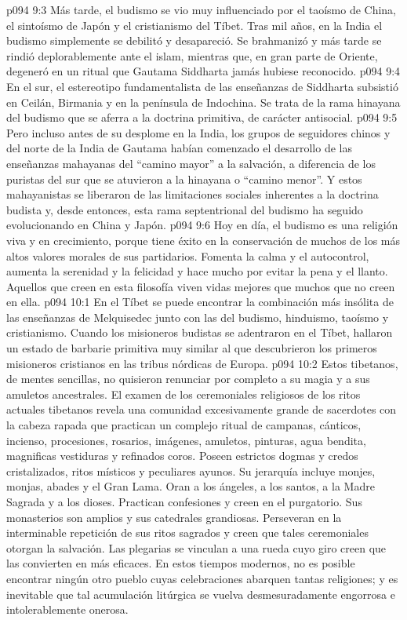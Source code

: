 \vs p094 9:3 Más tarde, el budismo se vio muy influenciado por el taoísmo de China, el sintoísmo de Japón y el cristianismo del Tíbet. Tras mil años, en la India el budismo simplemente se debilitó y desapareció. Se brahmanizó y más tarde se rindió deplorablemente ante el islam, mientras que, en gran parte de Oriente, degeneró en un ritual que Gautama Siddharta jamás hubiese reconocido.
\vs p094 9:4 En el sur, el estereotipo fundamentalista de las enseñanzas de Siddharta subsistió en Ceilán, Birmania y en la península de Indochina. Se trata de la rama hinayana del budismo que se aferra a la doctrina primitiva, de carácter antisocial.
\vs p094 9:5 Pero incluso antes de su desplome en la India, los grupos de seguidores chinos y del norte de la India de Gautama habían comenzado el desarrollo de las enseñanzas mahayanas del “camino mayor” a la salvación, a diferencia de los puristas del sur que se atuvieron a la hinayana o “camino menor”. Y estos mahayanistas se liberaron de las limitaciones sociales inherentes a la doctrina budista y, desde entonces, esta rama septentrional del budismo ha seguido evolucionando en China y Japón.
\vs p094 9:6 Hoy en día, el budismo es una religión viva y en crecimiento, porque tiene éxito en la conservación de muchos de los más altos valores morales de sus partidarios. Fomenta la calma y el autocontrol, aumenta la serenidad y la felicidad y hace mucho por evitar la pena y el llanto. Aquellos que creen en esta filosofía viven vidas mejores que muchos que no creen en ella.
\vs p094 10:1 En el Tíbet se puede encontrar la combinación más insólita de las enseñanzas de Melquisedec junto con las del budismo, hinduismo, taoísmo y cristianismo. Cuando los misioneros budistas se adentraron en el Tíbet, hallaron un estado de barbarie primitiva muy similar al que descubrieron los primeros misioneros cristianos en las tribus nórdicas de Europa.
\vs p094 10:2 Estos tibetanos, de mentes sencillas, no quisieron renunciar por completo a su magia y a sus amuletos ancestrales. El examen de los ceremoniales religiosos de los ritos actuales tibetanos revela una comunidad excesivamente grande de sacerdotes con la cabeza rapada que practican un complejo ritual de campanas, cánticos, incienso, procesiones, rosarios, imágenes, amuletos, pinturas, agua bendita, magnificas vestiduras y refinados coros. Poseen estrictos dogmas y credos cristalizados, ritos místicos y peculiares ayunos. Su jerarquía incluye monjes, monjas, abades y el Gran Lama. Oran a los ángeles, a los santos, a la Madre Sagrada y a los dioses. Practican confesiones y creen en el purgatorio. Sus monasterios son amplios y sus catedrales grandiosas. Perseveran en la interminable repetición de sus ritos sagrados y creen que tales ceremoniales otorgan la salvación. Las plegarias se vinculan a una rueda cuyo giro creen que las convierten en más eficaces. En estos tiempos modernos, no es posible encontrar ningún otro pueblo cuyas celebraciones abarquen tantas religiones; y es inevitable que tal acumulación litúrgica se vuelva desmesuradamente engorrosa e intolerablemente onerosa.
